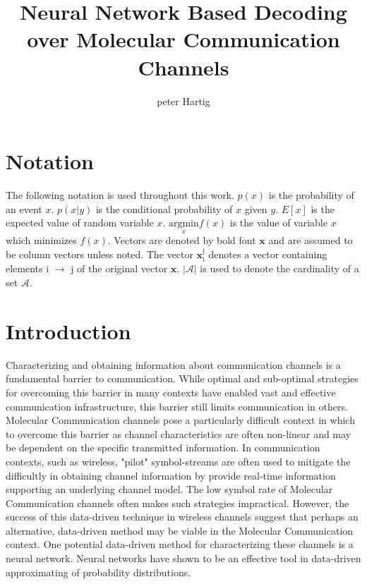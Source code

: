 \documentclass[12pt,a4paper]{report}
\title{Neural Network Based Decoding over Molecular Communication Channels}
\author{peter Hartig}
\begin{document}
\maketitle

\begin{abstract}

\end{abstract}

\newpage
\tableofcontents
\newpage
\section{Notation}
The following notation is used throughout this work.
$p(x)$ is the probability of an event $x$.
$p(x|y)$ is the conditional probability of $x$ given $y$.
$E[x]$ is the expected value of random variable $x$.
$\underset{x}{\text{argmin}} f(x)$ is the value of variable $x$ which minimizes $f(x)$.
Vectors  are denoted by bold font $\mathbf{x}$ and are assumed to be column vectors unless noted.
The vector $\mathbf{x}_{\mathrm{i}}^{\mathrm{j}}$ denotes a vector containing elements i $\rightarrow$ j of the original vector $\mathbf{x}$. $|\mathcal{A}|$ is used to denote the cardinality of a set $\mathcal{A}$.

\section{Introduction}
Characterizing and obtaining information about communication channels is a fundamental barrier to communication. While optimal and sub-optimal strategies for overcoming this barrier in many contexts have enabled vast and effective communication infrastructure, this barrier still limits communication in others. Molecular Communication channels pose a particularly difficult context in which to overcome this barrier as channel characteristics are often non-linear and may be dependent on the specific transmitted information.
In communication contexts, such as wireless, "pilot" symbol-streams are often used to mitigate the difficultly in obtaining channel information by provide real-time information supporting an underlying channel model. The low symbol rate of Molecular Communication channels often makes such strategies impractical. However, the success of this data-driven technique in wireless channels suggest that perhaps an alternative, data-driven method may be viable in the Molecular Communication context. One potential data-driven method for characterizing these channels is a neural network. Neural networks have shown to be an effective tool in data-driven approximating of probability distributions.
\par
\end{document}
